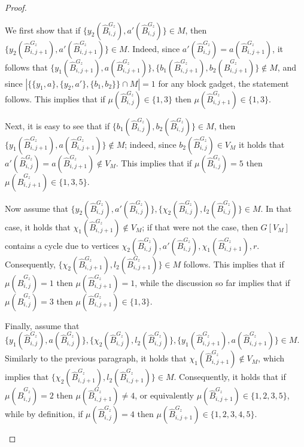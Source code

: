 \begin{proof}
\begin{nestedproof}
\begin{claimproof}
                We first show that if $\{y_2 (\hat{B}^{G_z}_{i,j}) ,a' (\hat{B}^{G_z}_{i,j})\} \in M$,
                then $\{y_2 (\hat{B}^{G_z}_{i,j+1}), a' (\hat{B}^{G_z}_{i,j+1})\} \in M$.
                Indeed, since $a' (\hat{B}^{G_z}_{i,j}) = a (\hat{B}^{G_z}_{i,j+1})$,
                it follows that $\{y_1 (\hat{B}^{G_z}_{i,j+1}), a(\hat{B}^{G_z}_{i,j+1})\}, \{b_1 (\hat{B}^{G_z}_{i,j+1}),b_2 (\hat{B}^{G_z}_{i,j+1})\} \notin M$,
                and since $|\{\{ y_1, a \}, \{ y_2, a' \}, \{ b_1, b_2 \}\} \cap M| = 1$ for any block gadget,
                the statement follows.
                This implies that if $\mu (\hat{B}^{G_z}_{i,j}) \in \{1,3\}$ then $\mu (\hat{B}^{G_z}_{i,j+1}) \in \{1,3\}$.

                Next, it is easy to see that if $\{b_1 (\hat{B}^{G_z}_{i,j}) ,b_2 (\hat{B}^{G_z}_{i,j})\} \in M$,
                then $\{y_1 (\hat{B}^{G_z}_{i,j+1}), a (\hat{B}^{G_z}_{i,j+1})\} \notin M$; indeed,
                since $b_2 (\hat{B}^{G_z}_{i,j}) \in V_M$ it holds that $a' (\hat{B}^{G_z}_{i,j}) = a (\hat{B}^{G_z}_{i,j+1}) \notin V_M$.
                This implies that if $\mu (\hat{B}^{G_z}_{i,j}) = 5$ then $\mu (\hat{B}^{G_z}_{i,j+1}) \in \{1,3,5\}$.

                Now assume that $\{y_2 (\hat{B}^{G_z}_{i,j}) ,a' (\hat{B}^{G_z}_{i,j})\} , \{\chi_2 (\hat{B}^{G_z}_{i,j}) ,l_2 (\hat{B}^{G_z}_{i,j})\} \in M$.
                In that case, it holds that $\chi_1 (\hat{B}^{G_z}_{i,j+1}) \notin V_M$;
                if that were not the case,
                then $G[V_M]$ contains a cycle due to vertices $\chi_2 (\hat{B}^{G_z}_{i,j}) ,a' (\hat{B}^{G_z}_{i,j}), \chi_1 (\hat{B}^{G_z}_{i,j+1}), r$.
                Consequently, $\{\chi_2 (\hat{B}^{G_z}_{i,j+1}), l_2 (\hat{B}^{G_z}_{i,j+1})\} \in M$ follows.
                This implies that if $\mu (\hat{B}^{G_z}_{i,j}) = 1$ then $\mu (\hat{B}^{G_z}_{i,j+1}) = 1$,
                while the discussion so far implies that if $\mu (\hat{B}^{G_z}_{i,j}) = 3$ then $\mu (\hat{B}^{G_z}_{i,j+1}) \in \{1,3\}$.

                Finally, assume that $\{y_1 (\hat{B}^{G_z}_{i,j}) ,a (\hat{B}^{G_z}_{i,j})\} , \{\chi_2 (\hat{B}^{G_z}_{i,j}) ,l_2 (\hat{B}^{G_z}_{i,j})\},
                \{y_1 (\hat{B}^{G_z}_{i,j+1}) , a (\hat{B}^{G_z}_{i,j+1})\} \in M$.
                Similarly to the previous paragraph, it holds that $\chi_1 (\hat{B}^{G_z}_{i,j+1}) \notin V_M$,
                which implies that $\{\chi_2 (\hat{B}^{G_z}_{i,j+1}), l_2 (\hat{B}^{G_z}_{i,j+1})\} \in M$.
                Consequently, it holds that if $\mu (\hat{B}^{G_z}_{i,j}) = 2$ then $\mu (\hat{B}^{G_z}_{i,j+1}) \neq 4$,
                or equivalently $\mu (\hat{B}^{G_z}_{i,j+1}) \in \{1,2,3,5\}$,
                while by definition, if $\mu (\hat{B}^{G_z}_{i,j}) = 4$ then $\mu (\hat{B}^{G_z}_{i,j+1}) \in \{1,2,3,4,5\}$.


\end{claimproof}
\end{nestedproof}
\end{proof}
